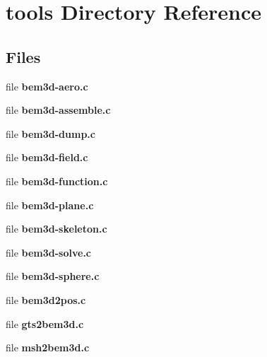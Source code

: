 \section{tools Directory Reference}
\label{dir_4eeb864c4eec08c7d6b9d3b0352cfdde}
\subsection*{Files}
\begin{DoxyCompactItemize}
\item 
file {\bfseries bem3d-\/aero.\+c}
\item 
file {\bfseries bem3d-\/assemble.\+c}
\item 
file {\bfseries bem3d-\/dump.\+c}
\item 
file {\bfseries bem3d-\/field.\+c}
\item 
file {\bfseries bem3d-\/function.\+c}
\item 
file {\bfseries bem3d-\/plane.\+c}
\item 
file {\bfseries bem3d-\/skeleton.\+c}
\item 
file {\bfseries bem3d-\/solve.\+c}
\item 
file {\bfseries bem3d-\/sphere.\+c}
\item 
file {\bfseries bem3d2pos.\+c}
\item 
file {\bfseries gts2bem3d.\+c}
\item 
file {\bfseries msh2bem3d.\+c}
\end{DoxyCompactItemize}
